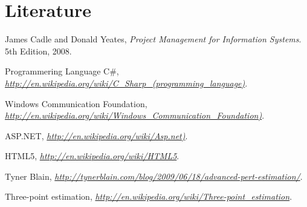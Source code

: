 \section{Literature}
\begin{thebibliography}{9}

  James Cadle and Donald Yeates,
  \emph{Project Management for Information Systems}.
  5th Edition,
  2008.

	Programmering Language C\#, 
  \emph{\url{http://en.wikipedia.org/wiki/C_Sharp_(programming_language)}}.
  
	Windows Communication Foundation, 
  \emph{\url{http://en.wikipedia.org/wiki/Windows_Communication_Foundation)}}.
  
	ASP.NET, 
  \emph{\url{http://en.wikipedia.org/wiki/Asp.net)}}.
  
	HTML5, 
  \emph{\url{http://en.wikipedia.org/wiki/HTML5}}.
  
	Tyner Blain, 
  \emph{\url{http://tynerblain.com/blog/2009/06/18/advanced-pert-estimation/}}.
  
  
	Three-point estimation, 
  \emph{\url{http://en.wikipedia.org/wiki/Three-point_estimation}}.
  
\end{thebibliography}